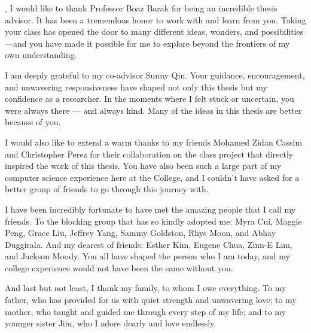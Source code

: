 , I would like to thank Professor Boaz Barak for being an incredible thesis advisor. It has been a tremendous honor to work with and learn from you. Taking your class has opened the door to many different ideas, wonders, and possibilities---and you have made it possible for me to explore beyond the frontiers of my own understanding.

I am deeply grateful to my co-advisor Sunny Qin. Your guidance, encouragement, and unwavering responsiveness have shaped not only this thesis but my confidence as a researcher. In the moments where I felt stuck or uncertain, you were always there --- and always kind. Many of the ideas in this thesis are better because of you.

I would also like to extend a warm thanks to my friends Mohamed Zidan Cassim and Christopher Perez for their collaboration on the class project that directly inspired the work of this thesis. You have also been such a large part of my computer science experience here at the College, and I couldn't have asked for a better group of friends to go through this journey with.

I have been incredibly fortunate to have met the amazing people that I call my friends. To the blocking group that has so kindly adopted me: Myra Cui, Maggie Peng, Grace Liu, Jeffrey Yang, Sammy Goldston, Rhys Moon, and Abhay Duggirala. And my dearest of friends: Esther Kim, Eugene Chua, Zinn-E Lim, and Jackson Moody. You all have shaped the person who I am today, and my college experience would not have been the same without you.

And last but not least, I thank my family, to whom I owe everything. To my father, who has provided for us with quiet strength and unwavering love; to my mother, who taught and guided me through every step of my life; and to my younger sister Jiin, who I adore dearly and love endlessly.